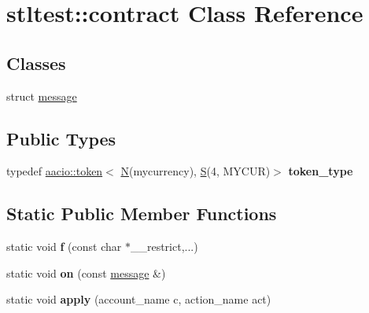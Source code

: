 \hypertarget{classstltest_1_1contract}{}\section{stltest\+:\+:contract Class Reference}
\label{classstltest_1_1contract}
\subsection*{Classes}
\begin{DoxyCompactItemize}
\item 
struct \mbox{\hyperlink{structstltest_1_1contract_1_1message}{message}}
\end{DoxyCompactItemize}
\subsection*{Public Types}
\begin{DoxyCompactItemize}
\item 
\mbox{\label{classstltest_1_1contract_a2b9daaa08e0fdb972794422834a2a3d3}} 
typedef \mbox{\hyperlink{classaacio_1_1token}{aacio\+::token}}$<$ \mbox{\hyperlink{group__types_gaf9c1edb0e0da55ec6ba09f32f6839529}{N}}(mycurrency), \mbox{\hyperlink{struct_s}{S}}(4, M\+Y\+C\+UR)$>$ {\bfseries token\+\_\+type}
\end{DoxyCompactItemize}
\subsection*{Static Public Member Functions}
\begin{DoxyCompactItemize}
\item 
\mbox{\label{classstltest_1_1contract_a5623142dbb23c14f730c8b4e391bf5ab}} 
static void {\bfseries f} (const char $\ast$\+\_\+\+\_\+restrict,...)
\item 
\mbox{\label{classstltest_1_1contract_a93073e9777ff377c88f1a26e7ad2ccaa}} 
static void {\bfseries on} (const \mbox{\hyperlink{structstltest_1_1contract_1_1message}{message}} \&)
\item 
\mbox{\label{classstltest_1_1contract_ad2ea41bce47766a5cce39c117737cc2f}} 
static void {\bfseries apply} (account\+\_\+name c, action\+\_\+name act)
\end{DoxyCompactItemize}
